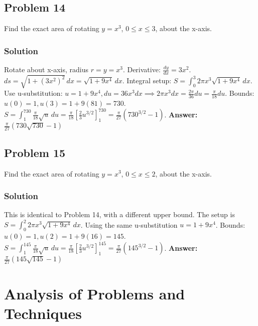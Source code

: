 \documentclass{article}
\begin{document}
\subsection{Problem 14}
Find the exact area of rotating $y=x^3$, $0 \le x \le 3$, about the x-axis.
\subsubsection*{Solution}
Rotate about x-axis, radius $r=y=x^3$.
Derivative: $ \frac{dy}{dx} = 3x^2 $.
$ds = \sqrt{1+(3x^2)^2} \,dx = \sqrt{1+9x^4} \,dx $.
Integral setup: $ S = \int_0^3 2\pi x^3 \sqrt{1+9x^4} \,dx $.
Use u-substitution: $u=1+9x^4, du=36x^3 dx \implies 2\pi x^3 dx = \frac{2\pi}{36}du = \frac{\pi}{18}du$.
Bounds: $u(0)=1, u(3)=1+9(81)=730$.
$ S = \int_1^{730} \frac{\pi}{18} \sqrt{u} \,du = \frac{\pi}{18} [\frac{2}{3}u^{3/2}]_1^{730} = \frac{\pi}{27}(730^{3/2}-1) $.
\textbf{Answer:} $ \frac{\pi}{27}(730\sqrt{730}-1) $

\subsection{Problem 15}
Find the exact area of rotating $y=x^3$, $0 \le x \le 2$, about the x-axis.
\subsubsection*{Solution}
This is identical to Problem 14, with a different upper bound.
The setup is $ S = \int_0^2 2\pi x^3 \sqrt{1+9x^4} \,dx $.
Using the same u-substitution $u=1+9x^4$.
Bounds: $u(0)=1, u(2)=1+9(16)=145$.
$ S = \int_1^{145} \frac{\pi}{18} \sqrt{u} \,du = \frac{\pi}{18} [\frac{2}{3}u^{3/2}]_1^{145} = \frac{\pi}{27}(145^{3/2}-1) $.
\textbf{Answer:} $ \frac{\pi}{27}(145\sqrt{145}-1) $

\section{Analysis of Problems and Techniques}
\end{document}
